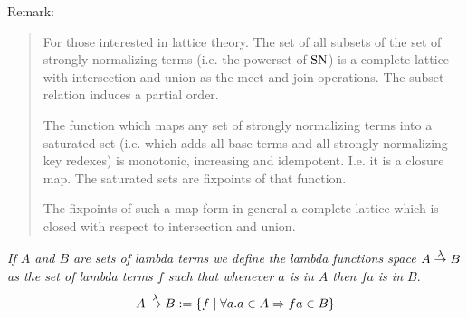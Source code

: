 Remark:
\begin{quote}

    For those interested in lattice theory. The set of all subsets of the set of
    strongly normalizing terms (i.e. the powerset of $\text{SN}$) is a complete
    lattice with intersection and union as the meet and join operations. The
    subset relation induces a partial order.

    The function which maps any set of
    strongly normalizing terms into a saturated set (i.e. which adds all base
    terms and all strongly normalizing key redexes) is monotonic, increasing and
    idempotent. I.e. it is a closure map. The saturated sets are fixpoints of
    that function.

    The fixpoints of such a map form in general a complete
    lattice which is closed with respect to intersection and union.

\end{quote}






\begin{definition}
    \emph{If $A$ and $B$ are sets of lambda terms we define the lambda functions
    space $A \stackrel{\lambda}{\to} B$ as the set of lambda terms $f$ such that whenever $a$
    is in $A$ then $fa$ is in $B$}.
    $$
    A \stackrel{\lambda}{\to} B := {\{f \mid \forall a. a \in A \Rightarrow fa \in B\}}
    $$
\end{definition}







